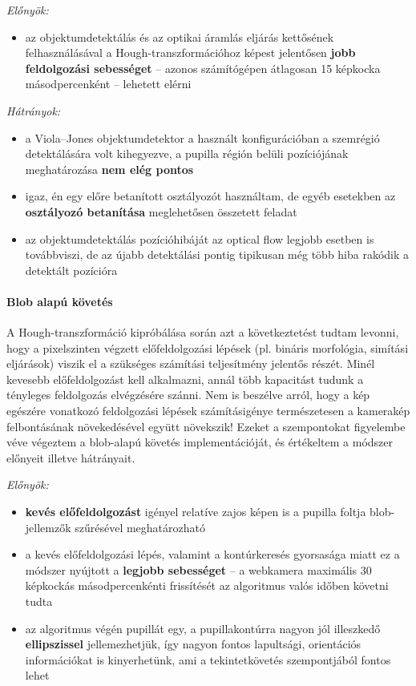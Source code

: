 \emph{Előnyök:}

\begin{itemize}
  \item az objektumdetektálás és az optikai áramlás eljárás kettősének felhasználásával a Hough-transzformációhoz képest jelentősen \textbf{jobb feldolgozási sebességet} -- azonos számítógépen átlagosan 15 képkocka másodpercenként -- lehetett elérni
\end{itemize}

\emph{Hátrányok:}

\begin{itemize}
  \item a Viola--Jones objektumdetektor a használt konfigurációban a szemrégió detektálására volt kihegyezve, a pupilla régión belüli pozíciójának meghatározása \textbf{nem elég pontos}
  \item igaz, én egy előre betanított osztályozót használtam, de egyéb esetekben az \textbf{osztályozó betanítása} meglehetősen összetett feladat
  \item az objektumdetektálás pozícióhibáját az optical flow legjobb esetben is továbbviszi, de az újabb detektálási pontig tipikusan még több hiba rakódik a detektált pozícióra
\end{itemize}

\medskip
\paragraph{Blob alapú követés}

A Hough-transzformáció kipróbálása során azt a következtetést tudtam levonni, hogy a pixelszinten végzett előfeldolgozási lépések (pl. bináris morfológia, simítási eljárások) viszik el a szükséges számítási teljesítmény jelentős részét. Minél kevesebb előfeldolgozást kell alkalmazni, annál több kapacitást tudunk a tényleges feldolgozás elvégzésére szánni. Nem is beszélve arról, hogy a kép egészére vonatkozó feldolgozási lépések számításigénye természetesen a kamerakép felbontásának növekedésével együtt növekszik! Ezeket a szempontokat figyelembe véve végeztem a blob-alapú követés implementációját, és értékeltem a módszer előnyeit illetve hátrányait.

\bigskip
\bigskip
\bigskip

\emph{Előnyök:}

\begin{itemize}
  \item \textbf{kevés előfeldolgozást} igényel relatíve zajos képen is a pupilla foltja blob-jellemzők szűrésével meghatározható
  \item a kevés előfeldolgozási lépés, valamint a kontúrkeresés gyorsasága miatt ez a módszer nyújtott a \textbf{legjobb sebességet} -- a webkamera maximális 30 képkockás másodpercenkénti frissítését az algoritmus valós időben követni tudta
  \item az algoritmus végén pupillát egy, a pupillakontúrra nagyon jól illeszkedő \textbf{ellipszissel} jellemezhetjük, így nagyon fontos lapultsági, orientációs információkat is kinyerhetünk, ami a tekintetkövetés szempontjából fontos lehet
\end{itemize}

